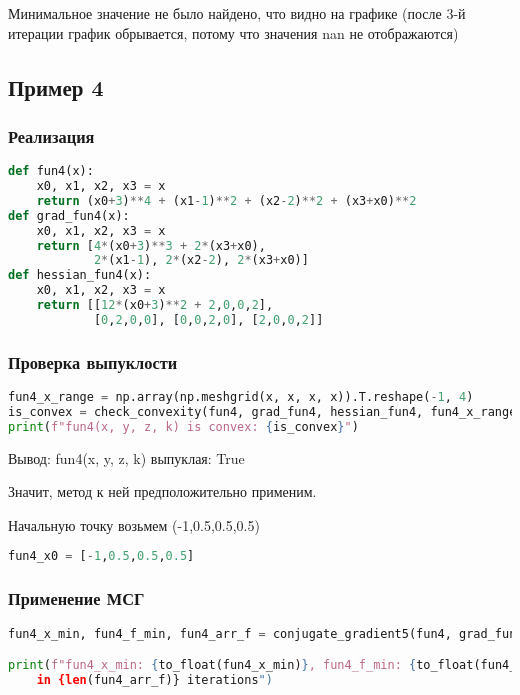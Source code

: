 \documentclass{article}
\begin{document}
Минимальное значение не было найдено, что видно на графике (после 3-й итерации график обрывается, потому что значения nan не отображаются)


\newpage
\subsection{Пример 4}

\subsubsection{Реализация}
\begin{lstlisting}[language=Python]
def fun4(x):
    x0, x1, x2, x3 = x
    return (x0+3)**4 + (x1-1)**2 + (x2-2)**2 + (x3+x0)**2
def grad_fun4(x):
    x0, x1, x2, x3 = x
    return [4*(x0+3)**3 + 2*(x3+x0),
            2*(x1-1), 2*(x2-2), 2*(x3+x0)]
def hessian_fun4(x):
    x0, x1, x2, x3 = x
    return [[12*(x0+3)**2 + 2,0,0,2],
            [0,2,0,0], [0,0,2,0], [2,0,0,2]]
\end{lstlisting}

\subsubsection{Проверка выпуклости}
\begin{lstlisting}[language=Python]
fun4_x_range = np.array(np.meshgrid(x, x, x, x)).T.reshape(-1, 4)
is_convex = check_convexity(fun4, grad_fun4, hessian_fun4, fun4_x_range)
print(f"fun4(x, y, z, k) is convex: {is_convex}")
\end{lstlisting}

Вывод: fun4(x, y, z, k) выпуклая: True

Значит, метод к ней предположительно применим.

Начальную точку возьмем (-1,0.5,0.5,0.5)

\begin{lstlisting}[language=Python]
fun4_x0 = [-1,0.5,0.5,0.5]
\end{lstlisting}

\newpage
\subsubsection{Применение МСГ}

\begin{lstlisting}[language=Python]
fun4_x_min, fun4_f_min, fun4_arr_f = conjugate_gradient5(fun4, grad_fun4, fun4_x0)

print(f"fun4_x_min: {to_float(fun4_x_min)}, fun4_f_min: {to_float(fun4_f_min)}
	in {len(fun4_arr_f)} iterations")
\end{lstlisting}
\end{document}
